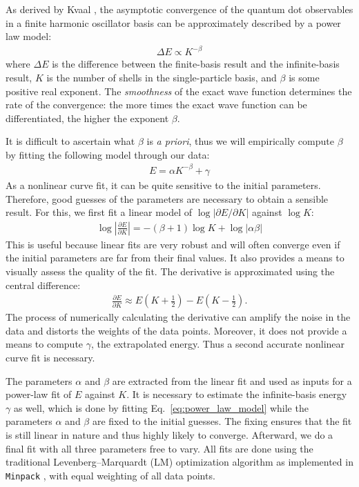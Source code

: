 As derived by Kvaal \cite{PhysRevB.80.045321,Kvaal2007}, the asymptotic convergence of the quantum dot observables in a finite harmonic oscillator basis can be approximately described by a power law model:
\begin{align*}
  \Delta E \propto K^{-\beta}
\end{align*}
where $\Delta E$ is the difference between the finite-basis result and the infinite-basis result, $K$ is the number of shells in the single-particle basis, and $\beta$ is some positive real exponent.  The \textit{smoothness} of the exact wave function determines the rate of the convergence: the more times the exact wave function can be differentiated, the higher the exponent $\beta$.

It is difficult to ascertain what $\beta$ is \textit{a priori}, thus we will empirically compute $\beta$ by fitting the following model through our data:
\begin{align} \label{eq:power_law_model}
  E = \alpha K^{-\beta} + \gamma
\end{align}
As a nonlinear curve fit, it can be quite sensitive to the initial parameters.  Therefore, good guesses of the parameters are necessary to obtain a sensible result.  For this, we first fit a linear model of $\log |\partial E / \partial K|$ against $\log K$:
\begin{align*}
  \log \left|\frac{\partial E}{\partial K}\right| = - (\beta + 1) \log K + \log|\alpha \beta|
\end{align*}
This is useful because linear fits are very robust and will often converge even if the initial parameters are far from their final values.  It also provides a means to visually assess the quality of the fit.  The derivative is approximated using the central difference:
\begin{align*}
  \frac{\partial E}{\partial K} \approx E\left(K + \frac{1}{2}\right) - E\left(K - \frac{1}{2}\right).
\end{align*}
The process of numerically calculating the derivative can amplify the noise in the data and distorts the weights of the data points.  Moreover, it does not provide a means to compute $\gamma$, the extrapolated energy.  Thus a second accurate nonlinear curve fit is necessary.

The parameters $\alpha$ and $\beta$ are extracted from the linear fit and used as inputs for a power-law fit of $E$ against $K$.  It is necessary to estimate the infinite-basis energy $\gamma$ as well, which is done by fitting Eq.\ \eqref{eq:power_law_model} while the parameters $\alpha$ and $\beta$ are fixed to the initial guesses.  The fixing ensures that the fit is still linear in nature and thus highly likely to converge.  Afterward, we do a final fit with all three parameters free to vary.  All fits are done using the traditional Levenberg--Marquardt (LM) optimization algorithm \cite{10.2307/43633451,doi:10.1137/0111030} as implemented in \texttt{Minpack} \cite{More1978,More:126569}, with equal weighting of all data points.

